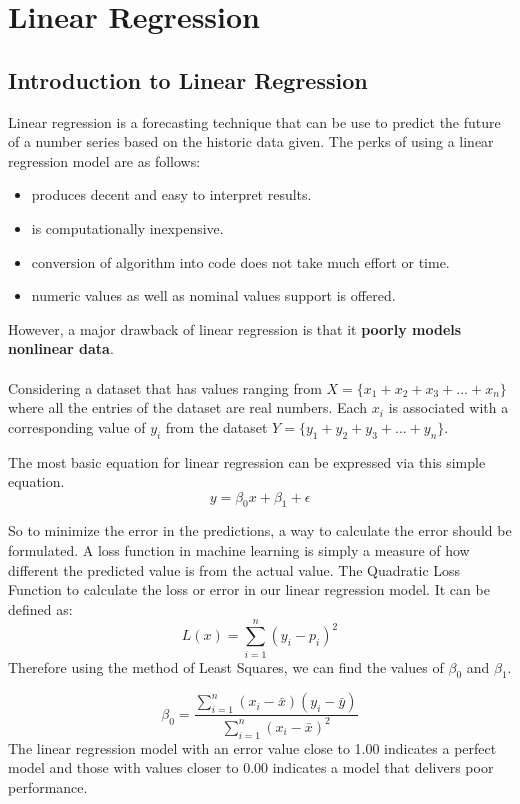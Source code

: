 \documentclass[12pt]{article}
\begin{document}
\section{Linear Regression}
\subsection{Introduction to Linear Regression}
Linear regression is a forecasting technique that can be use to predict the future of a number series based on the historic data given. The perks of using a linear regression model are as follows:

\begin{itemize}
  \item produces decent and  easy to interpret results.
  \item is computationally inexpensive.
  \item conversion of algorithm into code does not take much effort or time.
  \item numeric values as well as nominal values support is offered.
\end{itemize}

However, a major drawback of linear regression is that it \textbf{poorly models nonlinear data}.
\\\\
Considering a dataset that has values ranging from $X = \lbrace x_{1}+x_{2}+x_{3}+...+x_{n} \rbrace$ where
all the entries of the dataset are real numbers. Each $x_{i}$ is associated with a corresponding value of
$y_{i}$ from the dataset $Y = \lbrace y_{1}+y_{2}+y_{3}+...+y_{n} \rbrace$.

The most basic equation for linear regression can be expressed via this simple equation.
$$y = \beta_{0}x+\beta_{1}+\epsilon$$

So to minimize the error in the predictions, a way to calculate the error should be formulated. A loss function in machine learning is simply a measure of how different the predicted value is from the actual value. The Quadratic Loss Function to calculate the loss or error in our linear regression model. It can be defined as:
$$L(x) = \sum_{i=1}^{n}(y_{i}-p_{i})^{2} $$
Therefore using the method of Least Squares, we can find the values of $\beta_{0}$ and $\beta_{1}$.

$$
\beta_{0} = \frac{\sum_{i=1}^{n} ( x_{i}-\bar{x}) (y_{i}-\bar{y})}{\sum_{i=1}^{n} ( x_{i}-\bar{x})^{2} }
$$
The linear regression model with an error value close to 1.00 indicates a perfect model and those with values closer to 0.00 indicates a model that delivers poor performance.
\end{document}
